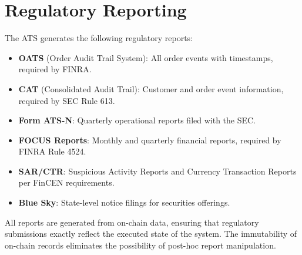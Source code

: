 \section{Regulatory Reporting}
\label{sec:reporting}

The ATS generates the following regulatory reports:

\begin{itemize}[nosep]
  \item \textbf{OATS} (Order Audit Trail System): All order events with timestamps, required by FINRA.
  \item \textbf{CAT} (Consolidated Audit Trail): Customer and order event information, required by SEC Rule 613.
  \item \textbf{Form ATS-N}: Quarterly operational reports filed with the SEC.
  \item \textbf{FOCUS Reports}: Monthly and quarterly financial reports, required by FINRA Rule 4524.
  \item \textbf{SAR/CTR}: Suspicious Activity Reports and Currency Transaction Reports per FinCEN requirements.
  \item \textbf{Blue Sky}: State-level notice filings for securities offerings.
\end{itemize}

All reports are generated from on-chain data, ensuring that regulatory submissions exactly reflect the executed state of the system. The immutability of on-chain records eliminates the possibility of post-hoc report manipulation.

